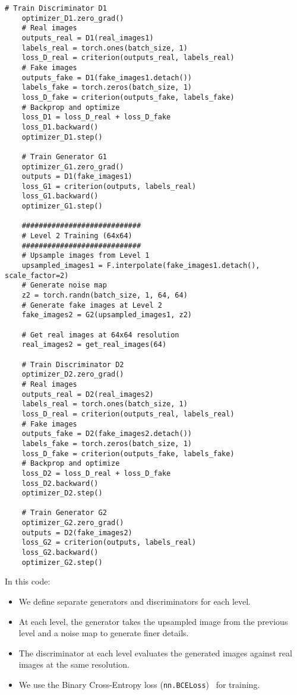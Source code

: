 \begin{lstlisting}[style=python]
    # Train Discriminator D1
    optimizer_D1.zero_grad()
    # Real images
    outputs_real = D1(real_images1)
    labels_real = torch.ones(batch_size, 1)
    loss_D_real = criterion(outputs_real, labels_real)
    # Fake images
    outputs_fake = D1(fake_images1.detach())
    labels_fake = torch.zeros(batch_size, 1)
    loss_D_fake = criterion(outputs_fake, labels_fake)
    # Backprop and optimize
    loss_D1 = loss_D_real + loss_D_fake
    loss_D1.backward()
    optimizer_D1.step()
    
    # Train Generator G1
    optimizer_G1.zero_grad()
    outputs = D1(fake_images1)
    loss_G1 = criterion(outputs, labels_real)
    loss_G1.backward()
    optimizer_G1.step()
    
    ############################
    # Level 2 Training (64x64)
    ############################
    # Upsample images from Level 1
    upsampled_images1 = F.interpolate(fake_images1.detach(), scale_factor=2)
    # Generate noise map
    z2 = torch.randn(batch_size, 1, 64, 64)
    # Generate fake images at Level 2
    fake_images2 = G2(upsampled_images1, z2)
    
    # Get real images at 64x64 resolution
    real_images2 = get_real_images(64)
    
    # Train Discriminator D2
    optimizer_D2.zero_grad()
    # Real images
    outputs_real = D2(real_images2)
    labels_real = torch.ones(batch_size, 1)
    loss_D_real = criterion(outputs_real, labels_real)
    # Fake images
    outputs_fake = D2(fake_images2.detach())
    labels_fake = torch.zeros(batch_size, 1)
    loss_D_fake = criterion(outputs_fake, labels_fake)
    # Backprop and optimize
    loss_D2 = loss_D_real + loss_D_fake
    loss_D2.backward()
    optimizer_D2.step()
    
    # Train Generator G2
    optimizer_G2.zero_grad()
    outputs = D2(fake_images2)
    loss_G2 = criterion(outputs, labels_real)
    loss_G2.backward()
    optimizer_G2.step()
\end{lstlisting}

In this code:

\begin{itemize}
    \item We define separate generators and discriminators for each level.
    \item At each level, the generator takes the upsampled image from the previous level and a noise map to generate finer details.
    \item The discriminator at each level evaluates the generated images against real images at the same resolution.
    \item We use the Binary Cross-Entropy loss (\texttt{nn.BCELoss})~\cite{ruby2020binary} for training.
\end{itemize}

